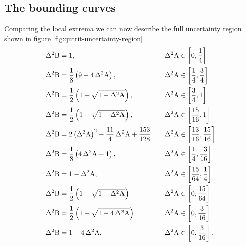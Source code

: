 \subsection{The bounding curves}
Comparing the local extrema we can now describe the full uncertainty region shown in figure \ref{fig:qutrit-uncertainty-region}
\begin{alignat}{2}
  & \var{\opb} = 1, \quad && \var{\opa}\in\left[0,\frac{1}{4}\right]\\
  & \var{\opb} = \frac{1}{8} \left(9-4\,\var{\opa}\right), \quad && \var{\opa}\in\left[\frac{1}{4},\frac{3}{4}\right]\\
  & \var{\opb} = \frac{1}{2} \left(1+\sqrt{1-\var{\opa}}\right), \quad && \var{\opa}\in\left[\frac{3}{4}, 1\right]\\
  & \var{\opb} = \frac{1}{2} \left(1-\sqrt{1-\var{\opa}}\right), \quad && \var{\opa}\in\left[\frac{15}{16}, 1\right]\\ 
  & \var{\opb} =  2 \left(\var{\opa}\right)^2-\frac{11}{4}\,\var{\opa}+\frac{153}{128} \quad && \var{\opa}\in\left[\frac{13}{16},\frac{15}{16}\right]\\
  & \var{\opb} = \frac{1}{8} \left(4\,\var{\opa}-1\right), \quad && \var{\opa}\in\left[\frac{1}{4}, \frac{13}{16}\right]\\
  & \var{\opb} = 1-\var{\opa}, \quad && \var{\opa}\in\left[\frac{15}{64},\frac{1}{4}\right]\\
  & \var{\opb} = \frac{1}{2}\left(1-\sqrt{1-\var{\opa}}\right) \quad && \var{\opa}\in\left[0,\frac{15}{64}\right]\\
  & \var{\opb} = \frac{1}{2} \left(1-\sqrt{1-4\,\var{\opa}}\right)\quad  && \var{\opa}\in\left[0,\frac{3}{16}\right]\\  
  & \var{\opb} = 1-4\,\var{\opa}, \quad && \var{\opa}\in\left[0,\frac{3}{16}\right].
  \label{eqn:gellmann-bounding-curves}
\end{alignat}

